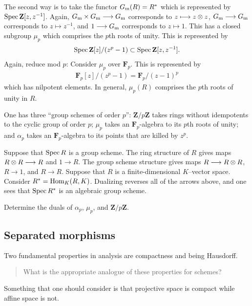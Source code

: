 \documentclass [11 pt, oneside] {article}
\begin{document}
The second way is to take the functor $G\textsubscript{m}(R)=R^*$ which is represented by $\operatorname{Spec} \mathbf{Z}[z,z^{-1}]$. Again, $G\textsubscript{m}\times G\textsubscript{m}\longrightarrow G\textsubscript{m}$ corresponds to $z\longmapsto z\otimes z$, $G\textsubscript{m}\longrightarrow G\textsubscript{m}$ corresponds to $z\longmapsto z^{-1}$, and $1\longrightarrow G\textsubscript{m}$ corresponds to $z\longmapsto 1$.
This has a closed subgroup $\mu_p$ which comprises the $p$th roots of unity. This is represented by
\begin{align*}
	\operatorname{Spec} \mathbf{Z}[z]/(z^p-1) \subset \operatorname{Spec} \mathbf{Z}[z,z^{-1}].
\end{align*}
Again, reduce mod $p$: Consider $\mu_p$ over $\mathbf{F}_{p}$. This is represented by
\begin{align*}
	\mathbf{F}_{p}[z]/(z^p-1) =  \mathbf{F}_{p}/(z-1) ^p
\end{align*}
which has nilpotent elements. 
In general, $\mu_p(R)$ comprises the $p$th roots of unity in $R$.

One has three ``group schemes of order $p$'': $\mathbf{Z}/p\mathbf{Z}$ takes rings without idempotents to the cyclic group of order $p$; $\mu_p$ takes an $\mathbf{F}_{p}$-algebra to its $p$th roots of unity; and $\alpha_p$ takes an $\mathbf{F}_{p}$-algebra to its points that are killed by $z^p$.

\begin{exercise}\label{cduality}\text{}
Suppose that $\operatorname{Spec} R$ is a group scheme. The ring structure of $R$ gives maps $R\otimes R\longrightarrow R$ and $1\longrightarrow R$. The group scheme structure gives maps $R\longrightarrow R\otimes R$, $R\longrightarrow 1$, and $R\longrightarrow R$. 
Suppose that $R$ is a finite-dimensional $K$--vector space. Consider $R^* = \operatorname{Hom}_{K}(R, K)$. Dualizing reverses all of the arrows above, and one sees that $\operatorname{Spec} R^*$ is an algebraic group scheme.

Determine the duals of $\alpha_p$, $\mu_p$, and $\mathbf{Z}/p\mathbf{Z}$.
\end{exercise}

\subsection{Separated morphisms}
Two fundamental properties in analysis are compactness and being Hausdorff. 
\begin{quote}
	\small What is the appropriate analogue of these properties for schemes?
\end{quote}
Something that one should consider is that projective space is compact while affine space is not.
\end{document}
